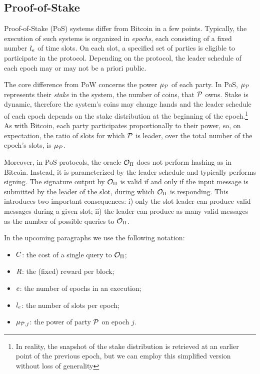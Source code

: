 \subsection{Proof-of-Stake}\label{subsec:pos}

Proof-of-Stake (PoS) systems differ from Bitcoin in a few points. Typically, the
execution of such systems is organized in \emph{epochs}, each consisting of a
fixed number $l_e$ of time slots. On each slot, a specified set of
parties is eligible to participate in the protocol. Depending on the protocol,
the leader schedule of each epoch may or may not be a priori public.

The core difference from PoW concerns the power $\mu_{\mathcal{P}}$ of each
party. In PoS, $\mu_{\mathcal{P}}$ represents their \emph{stake} in the
system, \ie the number of coins, that $\mathcal{P}$ owns. Stake is dynamic,
therefore the system's coins may change hands and the leader schedule of each
epoch depends on the stake distribution at the beginning of the
epoch.\footnote{In reality, the snapshot of the stake distribution is retrieved
at an earlier point of the previous epoch, but we can employ this simplified
version without loss of generality} As with Bitcoin, each party participates
proportionally to their power, so, on expectation, the ratio of slots for which
$\mathcal{P}$ is leader, over the total number of the epoch's slots, is
$\mu_{\mathcal{P}}$.

Moreover, in PoS protocols, the oracle $\mathcal{O}_\Pi$ does not perform hashing
as in Bitcoin. Instead, it is parameterized by the leader schedule and
typically performs signing. The signature output by $\mathcal{O}_\Pi$ is valid
if and only if the input message is submitted by the leader of the slot, during
which $\mathcal{O}_\Pi$ is responding. This introduces two important
consequences: i) only the slot leader can produce valid messages during a
given slot; ii) the leader can produce as many valid messages as the number
of possible queries to $\mathcal{O}_\Pi$.

In the upcoming paragraphs we use the following notation:
\begin{itemize}
    \item $C$: the cost of a single query to $\mathcal{O}_\Pi$;
    \item $R$: the (fixed) reward per block;
    \item $e$: the number of epochs in an execution;
    \item $l_e$: the number of slots per epoch;
    \item $\mu_{\mathcal{P}, j}$: the power of party $\mathcal{P}$ on epoch $j$.
\end{itemize}
